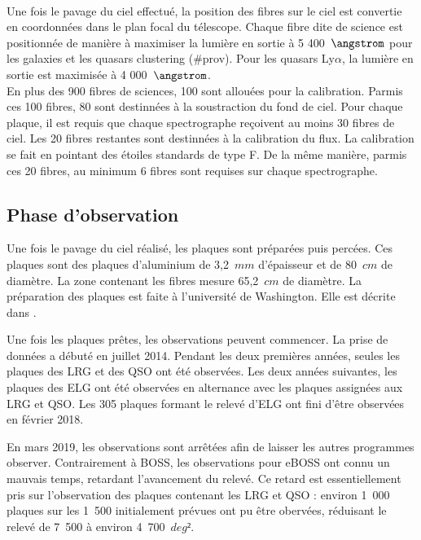 \documentclass[11pt, twoside, a4paper, openright]{report}
\begin{document}
\paragraph{} Une fois le pavage du ciel effectué, la position des fibres sur le ciel est convertie en coordonnées dans le plan focal du télescope. Chaque fibre dite de science est positionnée de manière à maximiser la lumière en sortie à 5 400~$\angstrom$ pour les galaxies et les quasars clustering (\#prov). Pour les quasars Ly$\alpha$, la lumière en sortie est maximisée à 4 000~$\angstrom$. \\
En plus des 900 fibres de sciences, 100 sont allouées pour la calibration. Parmis ces 100 fibres, 80 sont destinnées à la soustraction du fond de ciel. Pour chaque plaque, il est requis que chaque spectrographe reçoivent au moins 30 fibres de ciel. Les 20 fibres restantes sont destinnées à la calibration du flux. La calibration se fait en pointant des étoiles standards de type F. De la même manière, parmis ces 20 fibres, au minimum 6 fibres sont requises sur chaque spectrographe.


\subsection{Phase d'observation}

Une fois le pavage du ciel réalisé, les plaques sont préparées puis percées. Ces plaques sont des plaques d'aluminium de 3,2~$mm$ d'épaisseur et de 80~$cm$ de diamètre. La zone contenant les fibres mesure 65,2~$cm$ de diamètre. La préparation des plaques est faite à l'université de Washington. Elle est décrite dans \cite{Blanton2017}.

Une fois les plaques prêtes, les observations peuvent commencer. La prise de données a débuté en juillet 2014. Pendant les deux premières années, seules les plaques des LRG et des QSO ont été observées. Les deux années suivantes, les plaques des ELG ont été observées en alternance avec les plaques assignées aux LRG et QSO. Les 305 plaques formant le relevé d'ELG ont fini d'être observées en février 2018. 

En mars 2019, les observations sont arrêtées afin de laisser les autres programmes observer. Contrairement à BOSS, les observations pour eBOSS ont connu un mauvais temps, retardant l'avancement du relevé. Ce retard est essentiellement pris sur l'observation des plaques contenant les LRG et QSO : environ 1~000 plaques sur les 1~500 initialement prévues ont pu être obervées, réduisant le relevé de 7~500 à environ 4~700~$deg²$.
\end{document}
